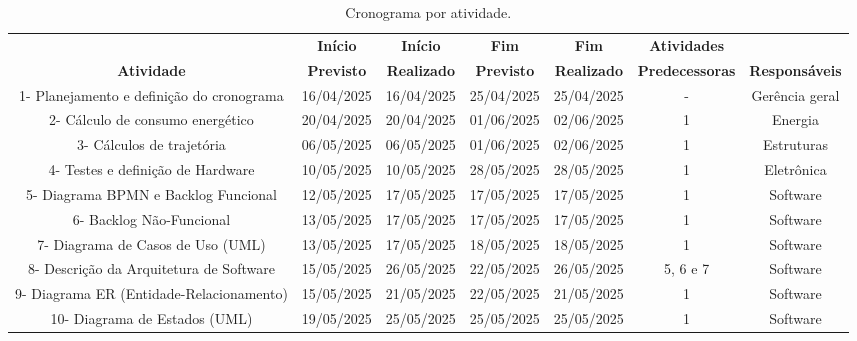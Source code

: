 \begin{landscape}

\begin{table}[htpb]
\begin{center}
\caption{Cronograma por atividade.}
\begin{tabular}{|c|c|c|c|c|c|c|}
\hline
& \textbf{Início} & \textbf{Início} & \textbf{Fim} & \textbf{Fim} & \textbf{Atividades} & \\
\textbf{Atividade} & \textbf{Previsto} & \textbf{Realizado} & \textbf{Previsto} & \textbf{Realizado} & \textbf{Predecessoras} & \textbf{Responsáveis}\\ \hline

1- Planejamento e definição do cronograma  & 16/04/2025      & 16/04/2025 & 25/04/2025 & 25/04/2025 & - & Gerência geral  
\\ \hline

2- Cálculo de consumo energético & 20/04/2025 & 20/04/2025 & 01/06/2025 & 02/06/2025 & 1 & Energia 
\\ \hline

3- Cálculos de trajetória & 06/05/2025 & 06/05/2025 & 01/06/2025 & 02/06/2025 & 1 & Estruturas 
\\ \hline

4- Testes e definição de Hardware & 10/05/2025 & 10/05/2025 & 28/05/2025 & 28/05/2025 & 1 & Eletrônica     \\ \hline

5- Diagrama BPMN e Backlog Funcional & 12/05/2025 & 17/05/2025 & 17/05/2025 & 17/05/2025 & 1 & Software       \\ \hline

6- Backlog Não-Funcional & 13/05/2025 & 17/05/2025 & 17/05/2025 & 17/05/2025 & 1 & Software 
\\ \hline

7- Diagrama de Casos de Uso (UML) & 13/05/2025 & 17/05/2025 & 18/05/2025 & 18/05/2025 & 1 & Software        \\ \hline

8- Descrição da Arquitetura de Software & 15/05/2025 & 26/05/2025 & 22/05/2025 & 26/05/2025 & 5, 6 e 7 & Software 
\\ \hline

9- Diagrama ER (Entidade-Relacionamento) & 15/05/2025 & 21/05/2025 & 22/05/2025 & 21/05/2025 & 1 & Software       \\ \hline

10- Diagrama de Estados (UML) & 19/05/2025 & 25/05/2025 & 25/05/2025 & 25/05/2025 & 1 & Software              
\\ \hline


\end{tabular}
\end{center}
\end{table}
\end{landscape}
